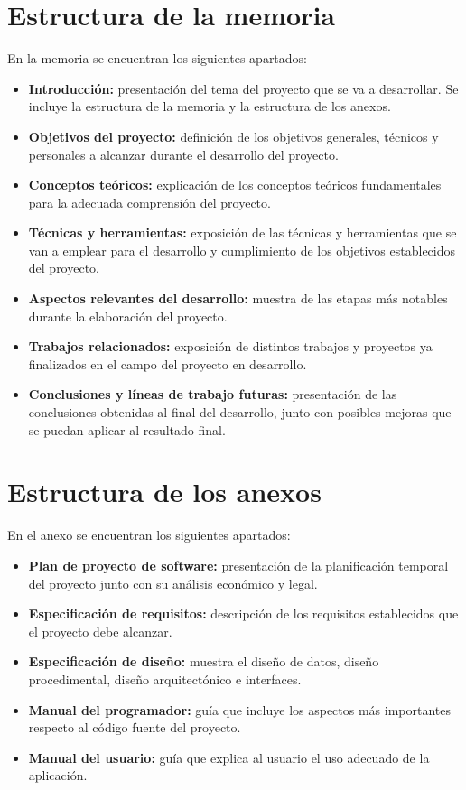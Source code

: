 \section{Estructura de la memoria}
En la memoria se encuentran los siguientes apartados:
\begin{itemize}
    \item \textbf{Introducción:} presentación del tema del proyecto que se va a desarrollar. Se incluye la estructura de la memoria y la estructura de los anexos.
    \item \textbf{Objetivos del proyecto:} definición de los objetivos generales, técnicos y personales a alcanzar durante el desarrollo del proyecto.
    \item \textbf{Conceptos teóricos:} explicación de los conceptos teóricos fundamentales para la adecuada comprensión del proyecto.
    \item \textbf{Técnicas y herramientas:} exposición de las técnicas y herramientas que se van a emplear para el desarrollo y cumplimiento de los objetivos establecidos del proyecto.
    \item \textbf{Aspectos relevantes del desarrollo:} muestra de las etapas más notables durante la elaboración del proyecto. 
    \item \textbf{Trabajos relacionados:} exposición de distintos trabajos y proyectos ya finalizados en el campo del proyecto en desarrollo.
    \item \textbf{Conclusiones y líneas de trabajo futuras:} presentación de las conclusiones obtenidas al final del desarrollo, junto con posibles mejoras que se puedan aplicar al resultado final.
\end{itemize}
\newpage

\section{Estructura de los anexos}
En el anexo se encuentran los siguientes apartados:
\begin{itemize}
    \item \textbf{Plan de proyecto de software:} presentación de la planificación temporal del proyecto junto con su análisis económico y legal.
    \item \textbf{Especificación de requisitos:} descripción de los requisitos establecidos que el proyecto debe alcanzar.
    \item \textbf{Especificación de diseño:} muestra el diseño de datos, diseño procedimental, diseño arquitectónico e interfaces.
    \item \textbf{Manual del programador:} guía que incluye los aspectos más importantes respecto al código fuente del proyecto.
    \item \textbf{Manual del usuario:} guía que explica al usuario el uso adecuado de la aplicación.
\end{itemize}

